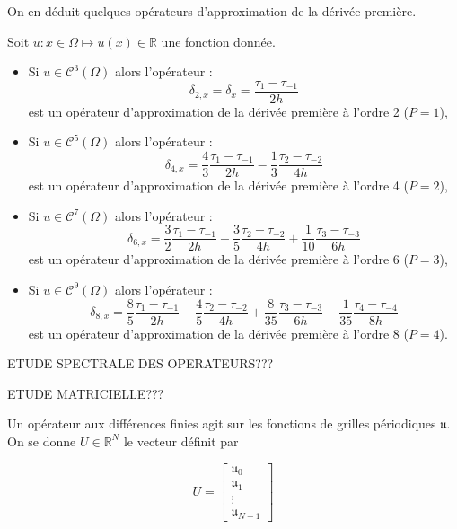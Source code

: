 On en déduit quelques opérateurs d'approximation de la dérivée première.
\begin{corollaire}
Soit $u :  x \in \Omega \mapsto u(x) \in \mathbb{R}$ une fonction donnée. 
\begin{itemize}
\item Si $u \in \mathcal{C}^3 (\Omega)$ alors l'opérateur :
\begin{equation}
\delta_{2,x} = \delta_x = \dfrac{\tau_1 - \tau_{-1}}{2h}
\label{eq:derprem_order2}
\end{equation}
est un opérateur d'approximation de la dérivée première à l'ordre 2 ($P=1$),
\item Si $u \in \mathcal{C}^5 (\Omega)$ alors l'opérateur :
\begin{equation}
\delta_{4,x} = \dfrac{4}{3} \dfrac{\tau_1 - \tau_{-1}}{2h} - \dfrac{1}{3} \dfrac{\tau_2 - \tau_{-2}}{4h}
\label{eq:derprem_order4}
\end{equation}
est un opérateur d'approximation de la dérivée première à l'ordre 4 ($P=2$),
\item Si $u \in \mathcal{C}^7 (\Omega)$ alors l'opérateur :
\begin{equation}
\delta_{6,x} = \dfrac{3}{2} \dfrac{\tau_1 - \tau_{-1}}{2h} - \dfrac{3}{5} \dfrac{\tau_2 - \tau_{-2}}{4h} + \dfrac{1}{10} \dfrac{\tau_3 - \tau_{-3}}{6h}
\label{eq:derprem_order6}
\end{equation}
est un opérateur d'approximation de la dérivée première à l'ordre 6 ($P=3$),
\item Si $u \in \mathcal{C}^9 (\Omega)$ alors l'opérateur :
\begin{equation}
\delta_{8,x} = \dfrac{8}{5} \dfrac{\tau_1 - \tau_{-1}}{2h} - \dfrac{4}{5} \dfrac{\tau_2 - \tau_{-2}}{4h} + \dfrac{8}{35} \dfrac{\tau_3 - \tau_{-3}}{6h} - \dfrac{1}{35} \dfrac{\tau_4 - \tau_{-4}}{8h}
\label{eq:derprem_order8}
\end{equation}
est un opérateur d'approximation de la dérivée première à l'ordre 8 ($P=4$).
\end{itemize}
\end{corollaire}


ETUDE SPECTRALE DES OPERATEURS???

ETUDE MATRICIELLE???

Un opérateur aux différences finies agit sur les fonctions de grilles périodiques $\mathfrak{u}$. On se donne $U \in  \mathbb{R}^{N}$ le vecteur définit par 

\begin{equation}
U =\begin{bmatrix}
\mathfrak{u}_0\\\mathfrak{u}_1\\ \vdots \\\mathfrak{u}_{N-1}
\end{bmatrix}
\end{equation}

